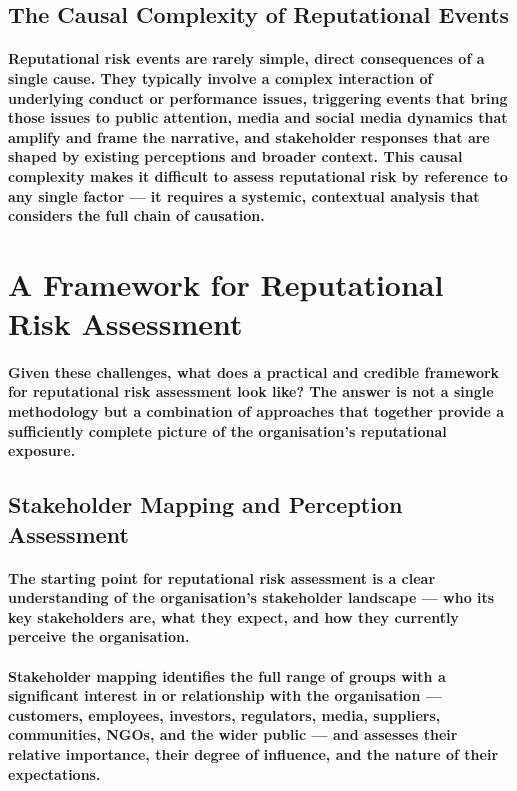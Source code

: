 \subsection{The Causal Complexity of Reputational Events}
\paragraph{Reputational risk events are rarely simple, direct consequences of a single cause. They typically involve a complex interaction of underlying conduct or performance issues, triggering events that bring those issues to public attention, media and social media dynamics that amplify and frame the narrative, and stakeholder responses that are shaped by existing perceptions and broader context. This causal complexity makes it difficult to assess reputational risk by reference to any single factor — it requires a systemic, contextual analysis that considers the full chain of causation.}

\section{A Framework for Reputational Risk Assessment}
\paragraph{Given these challenges, what does a practical and credible framework for reputational risk assessment look like? The answer is not a single methodology but a combination of approaches that together provide a sufficiently complete picture of the organisation's reputational exposure.}

\subsection{Stakeholder Mapping and Perception Assessment}
\paragraph{The starting point for reputational risk assessment is a clear understanding of the organisation's \textbf{stakeholder landscape} — who its key stakeholders are, what they expect, and how they currently perceive the organisation.}
\paragraph{\textbf{Stakeholder mapping} identifies the full range of groups with a significant interest in or relationship with the organisation — customers, employees, investors, regulators, media, suppliers, communities, NGOs, and the wider public — and assesses their relative importance, their degree of influence, and the nature of their expectations.}
